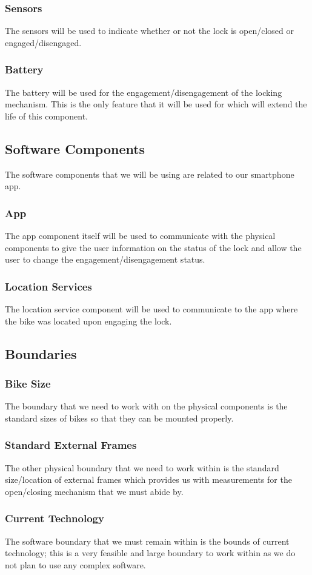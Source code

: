 \documentclass{article}
\begin{document}
\subsubsection{Sensors}
The sensors will be used to indicate whether or not the lock is open/closed or engaged/disengaged. 
\subsubsection{Battery}
The battery will be used for the engagement/disengagement of the locking mechanism.  This is the only feature that it will  be used for which will extend the life of this component.
\subsection {Software Components}
The software components that we will be using are related to our smartphone app.
\subsubsection {App}
The app component itself will be used to communicate with the physical components to give the user information on the status of the lock and allow the user to change the engagement/disengagement status. 
\subsubsection {Location Services}
The location service component will be used to communicate to the app where the bike was located upon engaging the lock.
\subsection {Boundaries}
\subsubsection{Bike Size}
The boundary that we need to work with on the physical components is the standard sizes of bikes so that they can be mounted properly.
\subsubsection{Standard External Frames}
The other physical boundary that we need to work within is the standard size/location of external frames which provides us with measurements for the open/closing mechanism that we must abide by.
\subsubsection{Current Technology}
The software boundary that we must remain within is the bounds of current technology; this is a very feasible and large boundary to work within as we do not plan to use any complex software.
\end{document}
